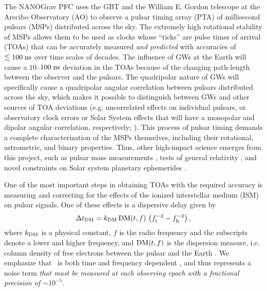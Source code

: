 \documentclass[10pt]{myNSF}
\begin{document}
The NANOGrav PFC uses the GBT and the William E. Gordon telescope at
the Arecibo Observatory (AO) to observe a pulsar timing array (PTA) of
millisecond pulsars (MSPs) distributed across the sky.  The extremely
high rotational stability of MSPs allows them to be used as clocks
whose ``ticks'' are pulse times of arrival (TOAs) that can be
accurately measured \emph{and predicted} with accuracies of $\lesssim
100\; \textrm{ns}$ over time scales of decades.  The influence of GWs at the
Earth will cause a $10$--$100\; \textrm{ns}$ deviation in the TOAs because of
the changing path-length between the observer and the pulsars.  The
quadripolar nature of GWs will specifically cause a quadripolar
angular correlation between pulsars distributed across the sky, which
makes it possible to distinguish between GWs and other sources of TOA
deviations (e.g. uncorrelated effects on individual pulsars, or
observatory clock errors or Solar System effects that will have a
monopolar and dipolar angular correlation, respectively;
\citealt{hd83}).  This process of pulsar timing demands a complete
characterization of the MSPs themselves, including their rotational,
astrometric, and binary properties.  Thus, other high-impact science
emerges from this project, such as pulsar mass measurements
\citep{epe+16}, tests of general relativity \citep{zsd+15}, and novel
constraints on Solar system planetary ephemerides \citep{abb+18}.

One of the most important steps in obtaining TOAs with the required
accuracy is measuring and correcting for the effects of the ionized
interstellar medium (ISM) on pulsar signals.  One of these effects is
a dispersive delay given by
\begin{equation}
  \Delta t_{\rm DM} = k_{\rm DM} \, \textrm{DM}(t,f)\, \left( f_{\rm l}^{-2} -
  f_{\rm h}^{-2} \right) ,
\end{equation}
where $k_{\rm DM}$ is a physical constant, $f$ is the radio frequency
and the subscripts denote a lower and higher frequency, and $\textrm{DM}(t,f)$
is the dispersion measure, i.e. column density of free electrons
between the pulsar and the Earth \citep[e.g.][]{lk12}.  We emphasize
that \DM\ is both time and frequency dependent \citep{css16}, and thus
represents a noise term \emph{that must be measured at each observing
  epoch with a fractional precision of $\sim 10^{-5}$}.
\end{document}
